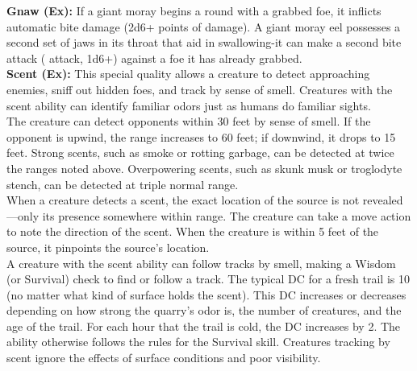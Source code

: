 \textbf{Gnaw (Ex):} If a giant moray begins a round with a grabbed foe, it inflicts automatic bite damage (2d6+\enhancedstat{\strengthnhalf} \hspace{1pt} points of damage). A giant moray eel possesses a second set of jaws in its throat that aid in swallowing-it can make a second bite attack (\enhancedstat{+\bite} \hspace{1pt} attack, 1d6+\enhancedstat{\strengthhalf}) against a foe it has already grabbed. \\

\textbf{Scent (Ex):} This special quality allows a creature to detect approaching enemies, sniff out hidden foes, and track by sense of smell. Creatures with the scent ability can identify familiar odors just as humans do familiar sights. \\

The creature can detect opponents within 30 feet by sense of smell. If the opponent is upwind, the range increases to 60 feet; if downwind, it drops to 15 feet. Strong scents, such as smoke or rotting garbage, can be detected at twice the ranges noted above. Overpowering scents, such as skunk musk or troglodyte stench, can be detected at triple normal range. \\

When a creature detects a scent, the exact location of the source is not revealed—only its presence somewhere within range. The creature can take a move action to note the direction of the scent. When the creature is within 5 feet of the source, it pinpoints the source's location. \\

A creature with the scent ability can follow tracks by smell, making a Wisdom (or Survival) check to find or follow a track. The typical DC for a fresh trail is 10 (no matter what kind of surface holds the scent). This DC increases or decreases depending on how strong the quarry's odor is, the number of creatures, and the age of the trail. For each hour that the trail is cold, the DC increases by 2. The ability otherwise follows the rules for the Survival skill. Creatures tracking by scent ignore the effects of surface conditions and poor visibility. \\

